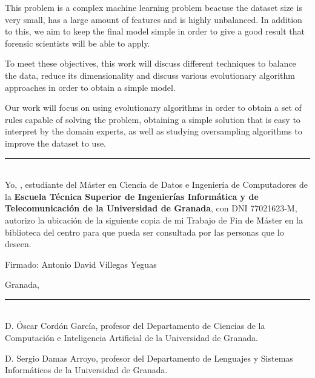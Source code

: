 This problem is a complex machine learning problem beacuse the dataset size is very small, has a large amount of features and is highly unbalanced. In addition to this, we aim to keep the final model simple in order to give a good result that forensic scientists will be able to apply.


To meet these objectives, this work will discuss different techniques to balance the data, reduce its dimensionality and discuss various evolutionary algorithm approaches in order to obtain a simple model.



Our work will focus on using evolutionary algorithms in order to obtain a set of rules capable of solving the problem, obtaining a simple solution that is easy to interpret by the domain experts, as well as studying oversampling algorithms to improve the dataset to use.



\newpage

\vspace*{2cm}

\rule{\linewidth}{1 mm} \\[1 cm]

{\large Yo, \textbf{\theauthor}, estudiante del Máster en Ciencia de Datos e Ingeniería de Computadores de la \textbf{Escuela Técnica Superior de Ingenierías Informática y de Telecomunicación de la Universidad de Granada}, con DNI 77021623-M, autorizo la ubicación de la siguiente copia de mi Trabajo de Fin de Máster en la biblioteca del centro para que pueda ser consultada por las personas que lo deseen.}

\vspace{7cm}

Firmado: Antonio David Villegas Yeguas

\vspace{2cm}

Granada, \thedate



\newpage

\vspace*{2cm}

\rule{\linewidth}{1 mm} \\[1 cm]

D. Óscar Cordón García, profesor del Departamento de Ciencias de la Computación e Inteligencia Artificial de la Universidad de Granada.

\vspace{1cm}

D. Sergio Damas Arroyo, profesor del Departamento de Lenguajes y Sistemas Informáticos de la Universidad de Granada.

